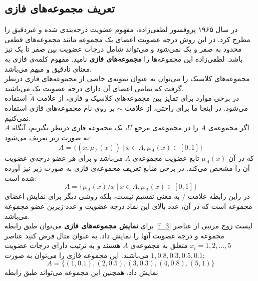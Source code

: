 \documentclass[12pt,a4paper]{article}
\theoremstyle{definition}
\begin{document}
 \subsection{تعریف مجموعه‌های فازی}
 
در سال ۱۹۶۵ پروفسور لطفی‌زاده، مفهوم عضویت درجه‌بندی شده و غیردقیق را مطرح کرد. در این روش درجه عضویت اعضای یک مجموعه مانند مجموعه‌های قطعی محدود به صفر و یک نمی‌شود و می‌تواند شامل درجات عضویت بین صفر تا یک نیز باشد. لطفی‌زاده این مجموعه‌ها را 
\textbf{مجموعه‌های فازی}
 نامید. مفهوم کلمه‌ی فازی به معنای نادقیق و مبهم می‌باشد. \\
 مجموعه‌های کلاسیک را می‌توان به عنوان نمونه‌ی خاصی از مجموعه‌های فازی درنظر گرفت که تمامی اعضای آن دارای درجه عضویت یک می‌باشند.
 \cite{Bojadziev2007}
 \\
 در برخی موارد برای تمایز بین مجموعه‌های کلاسیک و فازی، از علامت $\widetilde{A}$ استفاده می‌شود. 
 \cite{Lee2005}
 در اینجا ما برای راحتی، از علامت $ \sim $ بر روی نام مجموعه‌های فازی استفاده نمی‌کنیم.
 \\
 اگر مجموعه‌ی $A$ را در مجموعه‌ی مرجع $U$، یک مجموعه فازی درنظر بگیریم، آنگاه $A$ به صورت زیر تعریف می‌شود:
\begin{equation}\label{f_3}
A= \{  (x, \mu_{A}(x))\ |\ x \in A, \mu_{A}(x) \in [0,1]  \}
\end{equation} 
که در آن $\mu_{A}(x)$ تابع عضویت مجموعه‌ی $A$ می‌باشد و برای هر عضو درجه‌ی عضویت آن را مشخص می‌کند. 
در برخی منابع تعریف مجموعه‌ی فازی به صورت زیر نیز آورده شده است:
\begin{equation}\label{f_4}
A= \{  \mu_{A}(x)/x \ |\ x \in A, \mu_{A}(x) \in [0,1]  \}
\end{equation} 
در راین رابطه علامت $/$ به معنی تقسیم نیست، بلکه روشی دیگر برای نمایش اعضای مجموعه است که در آن، عدد بالای این نماد درجه عضویت و عدد زیرین عضو مجموعه می‌باشد.
 \cite{Bojadziev2007}
 \\
برای \textbf{نمایش مجموعه‌های فازی} می‌توان طبق رابطه
\ref{f_3}
لیست زوج مرتبی از عناصر مجموعه و درجه عضویت آنها را نمایش داد. به عنوان مثال فرض کنید عناصر 
$ x_{i}=1,2,...,5 $
متعلق به مجموعه‌ی $A$ هستند و به ترتیب دارای درجات عضویت 
$1, 0.8, 0.3, 0.5, 0.1$
می‌باشند. این مجموعه فازی را می‌توان به صورت:
\begin{equation}
A = \{ ( 1, 0.1), (2, 0.5), (3, 0.3), (4, 0.8), (5, 1)\}
\end{equation}
 نمایش داد. همچنین این مجموعه می‌تواند طبق رابطه 
\end{document}
